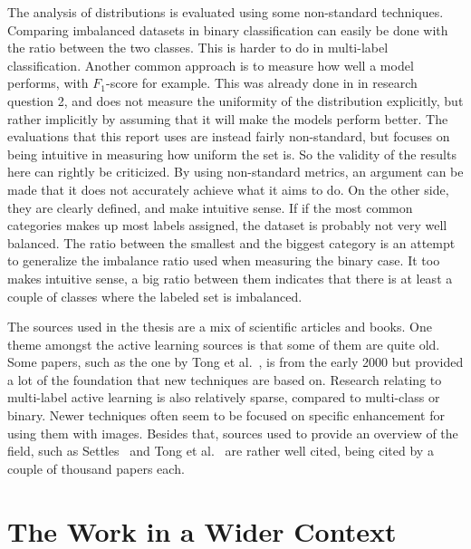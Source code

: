 The analysis of distributions is evaluated using some non-standard techniques.
Comparing imbalanced datasets in binary classification can easily be done with the ratio between the two classes.
This is harder to do in multi-label classification. 
Another common approach is to measure how well a model performs, with $F_1$-score for example.
This was already done in in research question 2, and does not measure the uniformity of the distribution explicitly, but rather implicitly by assuming that it will make the models perform better.
The evaluations that this report uses are instead fairly non-standard, but focuses on being intuitive in measuring how uniform the set is.
So the validity of the results here can rightly be criticized.
By using non-standard metrics, an argument can be made that it does not accurately achieve what it aims to do.
On the other side, they are clearly defined, and make intuitive sense.
If if the most common categories makes up most labels assigned, the dataset is probably not very well balanced.
The ratio between the smallest and the biggest category is an attempt to generalize the imbalance ratio used when measuring the binary case.
It too makes intuitive sense, a big ratio between them indicates that there is at least a couple of classes where the labeled set is imbalanced.

The sources used in the thesis are a mix of scientific articles and books.
One theme amongst the active learning sources is that some of them are quite old.
Some papers, such as the one by Tong et al.~\cite{tong2001support}, is from the early 2000 but provided a lot of the foundation that new techniques are based on.
Research relating to multi-label active learning is also relatively sparse, compared to multi-class or binary.
Newer techniques often seem to be focused on specific enhancement for using them with images.
Besides that, sources used to provide an overview of the field, such as Settles~\cite{settles2012active} and Tong et al\@.~\cite{tong2001active} are rather well cited, being cited by a couple of thousand papers each.

\section{The Work in a Wider Context}


